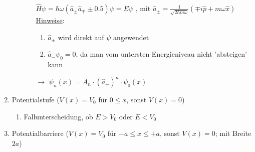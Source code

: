 \begin{enumerate}
\begin{enumerate}
\begin{enumerate}
            $\hat{H}\psi=\hbar \omega(\hat{a}_\pm \hat{a}_\mp \pm 0.5)\psi=E\psi$ , mit $\hat{a}_\pm=\frac{1}{\sqrt{2\hbar m \omega}}(\mp i\hat{p}+m \omega\hat{x})$ \\
            \underline{Hinweise}:
            \begin{enumerate}
                \item $\hat{a}_\pm$ wird direkt auf $\psi$ angewendet 
                \item $\hat{a}_- \psi_0=0$, da man vom untersten Energieniveau nicht 'absteigen' kann
            \end{enumerate} 
            $\rightarrow$ $\psi_n(x)=A_n\cdot (\hat{a}_+)^n \cdot \psi_0(x)$
        \end{enumerate}

    \end{enumerate}
    \item Potentialstufe ($V(x)=V_0$ für $0\leq x$, sonst $V(x)=0$)
    \begin{enumerate}
        \item Fallunterscheidung, ob $E>V_0$ oder $E<V_0$
    \end{enumerate}
    \item Potentialbarriere ($V(x)=V_0$ für $-a\leq x \leq +a$, sonst $V(x)=0$; mit Breite $2a$) \label{Potentialbarriere}
\end{enumerate}




\newpage